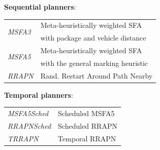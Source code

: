 \documentclass[a0paper,portrait,fontscale=0.2975]{TUTposter} %
\begin{document}
\begin{poster}
{\begin{flushleft}
\vspace{0.1em}
\textbf{Sequential planners}:
\vspace{0.1em}

{
\setlength{\tabcolsep}{3pt} %
\renewcommand{\arraystretch}{1} %
\begin{tabular}{@{}ll}
\multirow{2}{*}{\textit{MSFA3}} & Meta-heuristically weighted SFA\\
&  with package and vehicle distance\\[4pt]
\multirow{2}{*}{\textit{MSFA5}} & Meta-heuristically weighted SFA\\
& with the general marking heuristic\\[4pt]
\textit{RRAPN} & Rand. Restart Around Path Nearby
\end{tabular}

\vspace{0.4em}
\textbf{Temporal planners}:
\vspace{0.1em}

{
\setlength{\tabcolsep}{2pt} %
\renewcommand{\arraystretch}{1} %
\begin{tabular}{@{}ll}
\textit{MSFA5Sched} & Scheduled MSFA5\\[2pt]
\textit{RRAPNSched} & Scheduled RRAPN\\[2pt]
\textit{TRRAPN} & Temporal RRAPN
\end{tabular}
}
}
\end{flushleft}
}







\end{poster}
\end{document}
